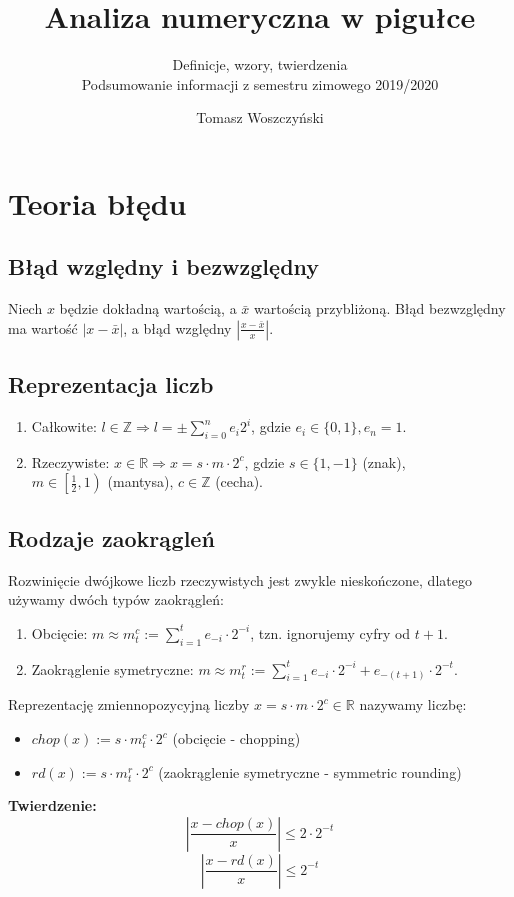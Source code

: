 \documentclass[a4paper,11pt]{article}
\author{Tomasz Woszczyński}
\title{Analiza numeryczna w pigułce}
\subtitle{Definicje, wzory, twierdzenia \\ Podsumowanie informacji z semestru zimowego 2019/2020}
\date{}
\begin{document}
\thispagestyle{empty}
\maketitle
\thispagestyle{empty}

\newpage
\thispagestyle{empty}
\mbox{}
\newpage

\newpage
\setcounter{page}{1}
\tableofcontents

\clearpage
\section{Teoria błędu}
\subsection{Błąd względny i bezwzględny}
Niech $x$ będzie dokładną wartością, a $\bar{x}$ wartością przybliżoną. Błąd bezwzględny ma wartość $\left| x-\bar{x} \right|$, a błąd względny $\left| \frac{x-\bar{x}}{x} \right|$.
\subsection{Reprezentacja liczb}
\begin{enumerate}[label=(\alph*)]
\item Całkowite: $l\in\mathbb{Z} \Rightarrow l=\pm\sum\limits_{i=0}^{n} e_{i}2^{i}$, gdzie $e_i \in \{0, 1\}, e_n = 1$.
\item Rzeczywiste: $x\in\mathbb{R} \Rightarrow x=s \cdot m \cdot 2^{c}$, gdzie $s\in\{1, -1\}$ (znak), \\
$m \in \left[\frac{1}{2}, 1\right)$ (mantysa), $c \in \mathbb{Z}$ (cecha).
\end{enumerate}

\subsection {Rodzaje zaokrągleń}
Rozwinięcie dwójkowe liczb rzeczywistych jest zwykle nieskończone, dlatego używamy dwóch typów zaokrągleń:
\begin{enumerate}[label=(\alph*)]
\item Obcięcie: $m \approx m_{t}^{c} := \sum\limits_{i=1}^{t} e_{-i}\cdot 2^{-i}$, tzn. ignorujemy cyfry od $t+1$.
\item Zaokrąglenie symetryczne: $m \approx m_{t}^{r} := \sum\limits_{i=1}^{t} e_{-i}\cdot 2^{-i}+e_{-(t+1)}\cdot 2^{-t}$.
\end{enumerate}
Reprezentację zmiennopozycyjną liczby $x = s\cdot m \cdot 2^{c} \in \mathbb{R}$ nazywamy liczbę:
\begin{itemize}
\item $chop(x) := s\cdot m_{t}^{c} \cdot 2^{c}$ (obcięcie - chopping)
\item $rd(x) :=s\cdot m_{t}^{r} \cdot 2^{c}$ (zaokrąglenie symetryczne - symmetric rounding)
\end{itemize}
\textbf{Twierdzenie:}
$$ \left| \frac{x-chop(x)}{x}\right| \leq 2\cdot2^{-t} $$
$$ \left| \frac{x-rd(x)}{x} \right| \leq 2^{-t} $$
\end{document}

